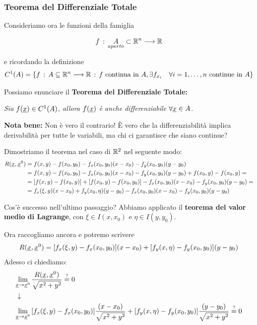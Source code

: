 \subsubsection{Teorema del Differenziale Totale}

Consideriamo ora le funzioni della famiglia

\begin{align}
f \, : \, \underset{aperto}{A} \subset \mathbb{R}^n \longrightarrow \mathbb{R}
\end{align}

e ricordando la definizione
\begin{align}
C^1(A)=\{ f \, : \, A\subseteq \mathbb{R}^n \longrightarrow \mathbb{R} \, : \, f \text{ continua in } A, \exists f_{x_i} \quad \forall i=1,\dots,  n \text{ continue in } A  \} \nonumber
\end{align} 

Possiamo enunciare il \textbf{Teorema del Differenziale Totale:}

\bigskip

\textit{Sia $f(\underline{x}) \in C^1(A)$, allora $f(\underline{x})$ è anche differenziabile $\forall \underline{x} \in A$.}

\bigskip
\textbf{Nota bene:} Non è vero il contrario! È vero che la differenziabilità implica derivabilità per tutte le variabili, ma chi ci garantisce che siano continue?

\bigskip

Dimostriamo il teorema nel caso di $\mathbb{R}^2$ nel seguente modo:
\begin{align}
R(\underline{x}, \underline{x}^0) {}&= f(x,y) - f(x_0,y_0) - f_x(x_0,y_0)(x-x_0) - f_y(x_0,y_0)(y-y_0) \nonumber \\
&= f(x,y) - f(x_0,y_0) - f_x(x_0,y_0)(x-x_0) - f_y(x_0,y_0)(y-y_0) + f(x_0,y) - f(x_0,y) = \nonumber \\
&= [f(x,y) - f(x_0,y)] + [f(x_0,y) - f(x_0,y_0) ] - f_x(x_0,y_0)(x-x_0) - f_y(x_0,y_0)(y-y_0) = \nonumber \\
&= f_x(\xi,y)(x-x_0) + f_y(x_0,\eta)(y-y_0) - f_x(x_0,y_0)(x-x_0) - f_y(x_0,y_0)(y-y_0)
\end{align}

Cos'è successo nell'ultimo passaggio? Abbiamo applicato il \textbf{teorema del valor medio di Lagrange}, con $\xi \in I(x,x_0)$ e $\eta \in I(y,y_0)$.

Ora raccogliamo ancora e potremo scrivere
\begin{align}
R(\underline{x}, \underline{x}^0)= [f_x(\xi,y) - f_x(x_0,y_0)](x-x_0) + [f_y(x,\eta) - f_y(x_0,y_0)](y-y_0)
\end{align}
Adesso ci chiediamo:
\begin{align}
{}&\underset{\underline{x} \rightarrow \underline{x}^0}{\lim} \, \frac{R(\underline{x}, \underline{x}^0)}{\sqrt{x^2 + y^2}} \overset{?}{=} 0 \nonumber \\ &\downarrow \nonumber \\
&\underset{\underline{x} \rightarrow \underline{x}^0}{\lim} \, [f_x(\xi,y) - f_x(x_0,y_0)]\frac{(x-x_0)}{\sqrt{x^2 + y^2}} + [f_y(x,\eta) - f_y(x_0,y_0)]\frac{(y-y_0)}{\sqrt{x^2 + y^2}} \overset{?}{=} 0
\end{align}

